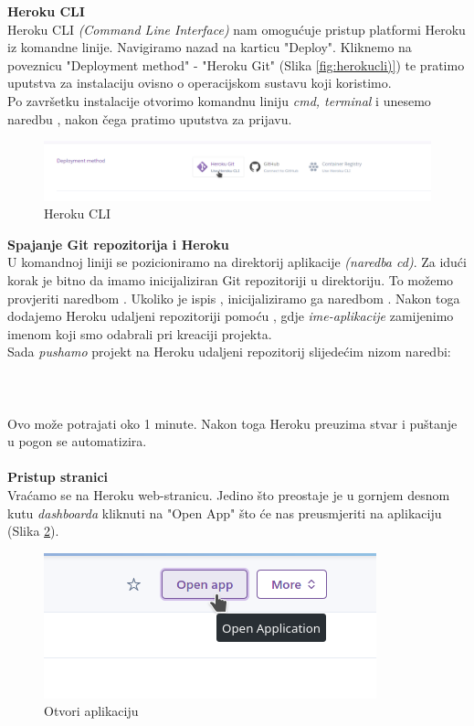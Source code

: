 			\noindent\textbf{Heroku CLI}\\
			Heroku CLI \textit{(Command Line Interface)} nam omogućuje pristup platformi Heroku iz komandne linije. 
			Navigiramo nazad na karticu "Deploy". Kliknemo na poveznicu "Deployment method" - "Heroku Git" (Slika \ref{fig:herokucli)}) te pratimo uputstva za instalaciju ovisno o operacijskom sustavu koji koristimo.\\
			Po završetku instalacije otvorimo komandnu liniju \textit{cmd, terminal} i unesemo naredbu , nakon čega pratimo uputstva za prijavu.
			\begin{figure}[H]
				\includegraphics[width=.9\linewidth]{slike/20210114_205522.png}
				\centering
				\caption{Heroku CLI}
				\label{fig:herokucli}
			\end{figure}
			\noindent\textbf{Spajanje Git repozitorija i Heroku}\\
			U komandnoj liniji se pozicioniramo na direktorij aplikacije \textit{(naredba cd)}. Za idući korak je bitno da imamo inicijaliziran Git repozitoriji u direktoriju. To možemo provjeriti naredbom . Ukoliko je ispis , inicijaliziramo ga naredbom . Nakon toga dodajemo Heroku udaljeni repozitoriji pomoću , gdje \textit{ime-aplikacije} zamijenimo imenom koji smo odabrali pri kreaciji projekta.\\
			Sada \textit{pushamo} projekt na Heroku udaljeni repozitorij slijedećim nizom naredbi:\\
			\\
			\\
			\\
			Ovo može potrajati oko 1 minute. Nakon toga Heroku preuzima stvar i puštanje u pogon se automatizira.
			\\\\
			\noindent\textbf{Pristup stranici}\\
			Vraćamo se na Heroku web-stranicu. Jedino što preostaje je u gornjem desnom kutu \textit{dashboarda} kliknuti na "Open App" što će nas preusmjeriti na aplikaciju (Slika \ref{fig:openapp}).
			\begin{figure}[H]
				\includegraphics[width=.9\linewidth]{slike/20210114_222433.png}
				\centering
				\caption{Otvori aplikaciju}
				\label{fig:openapp}
			\end{figure}
			\eject 